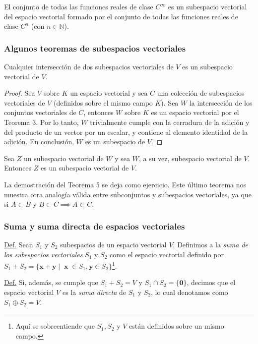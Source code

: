 \documentclass[12pt]{article}
\newenvironment{teorema}[2][Teorema]{\begin{trivlist}
\item[\hskip \labelsep {\bfseries #1}\hskip \labelsep {\bfseries #2.}]}{\end{trivlist}}
\begin{document}
\vspace{3mm}

El conjunto de todas las funciones reales de clase $C^{\infty}$ es un subespacio vectorial del espacio vectorial formado por el conjunto de todas las funciones reales de clase $C^n$ (con $n\in\mathbb{N}$).

\vspace{3mm}

\subsubsection{Algunos teoremas de subespacios vectoriales} \label{Teo:Subespacios_vectoriales}

\begin{teorema} 3 Cualquier intersección de dos subespacios vectoriales de $V$ es un subespacio vectorial de $V$.

\begin{proof}
Sea $V$ sobre $K$ un espacio vectorial y sea $C$ una colección de subespacios vectoriales de $V$ (definidos sobre el mismo campo $K$). Sea $W$ la intersección de los conjuntos vectoriales de $C$, entonces $W$ sobre $K$ es un espacio vectorial por el Teorema 3. Por lo tanto, $W$ trivialmente cumple con la cerradura de la adición y del producto de un vector por un escalar, y contiene al elemento identidad de la adición. En conclusión, $W$ es un subespacio de $V$.
\end{proof}
\end{teorema}

\begin{teorema} 4 Sea $Z$ un subespacio vectorial de $W$ y sea $W$, a su vez, subespacio vectorial de $V$. Entonces $Z$ es un subespacio vectorial de $V$.
\end{teorema}

\noindent La demostración del Teorema 5 se deja como ejercicio. Este último teorema nos muestra otra analogía válida entre subconjuntos y subespacios vectoriales, ya que si $A \subset B$ y $B\subset C \implies A\subset C$.

\subsubsection{Suma y suma directa de espacios vectoriales}

\begin{tcolorbox}
\underline{Def.} Sean $S_1$ y $S_2$ subespacios de un espacio vectorial $V$. Definimos a la \emph{suma de los subespacios vectoriales} $S_1$ y $S_2$ como el espacio vectorial definido por $S_1+S_2=\{\mathbf{x}+\mathbf{y}\mathop|\mathop \mathbf{x}\in S_1, \mathbf{y}\in S_2\}$\footnote{Aquí se sobreentiende que $S_1, S_2$ y $V$ están definidos sobre un mismo campo.}.

\vspace{3mm}

\underline{Def.} Si, además, se cumple que $S_1+S_2=V$ y $S_1 \cap S_2 = \{\mathbf{0}\}$, decimos que el espacio vectorial $V$ es la \emph{suma directa} de $S_1$ y $S_2$, lo cual denotamos como $S_1\oplus S_2=V$.
\end{tcolorbox}
\end{document}
